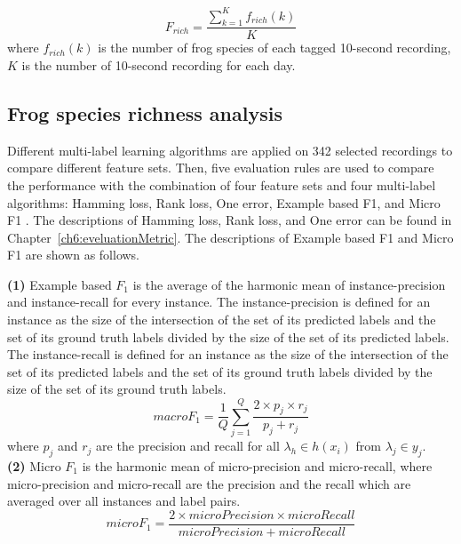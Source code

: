 \begin{equation}
F_{rich} = \frac{\sum_{k=1}^{K}f_{rich}(k)}{K}
\end{equation} 
where $f_{rich}(k)$ is the number of frog species of each tagged 10-second recording, $K$ is the number of 10-second recording for each day.





\subsection{Frog species richness analysis}
Different multi-label learning algorithms are applied on 342 selected recordings to compare different feature sets. Then, five evaluation rules are used to compare the performance with the combination of four feature sets and four multi-label algorithms: Hamming loss, Rank loss, One error, Example based F1, and Micro F1 \citep{Madjarov20123084, ZhangReview2014}. The descriptions of Hamming loss, Rank loss, and One error can be found in Chapter~\ref{ch6:eveluationMetric}. The descriptions of Example based F1  and Micro F1 are shown as follows.



\textbf{(1)}
Example based $F_{1}$ is the average of the harmonic mean of instance-precision and instance-recall for every instance. The instance-precision is defined for an instance as the size of the intersection of the set of its predicted labels and the set of its ground truth labels divided by the size of the set of its predicted labels. The instance-recall is defined for an instance as the size of the intersection of the set of its predicted labels and the set of its ground truth labels divided by the size of the set of its ground truth labels.
\begin{equation}
macroF_{1}=\frac{1}{Q}\sum_{j=1}^{Q}\frac{2 \times p_{j} \times r_{j}}{p_{j}+r_{j}}
\end{equation}
where $p_{j}$ and $r_{j}$ are the precision and recall for all $\lambda_{h} \in h(x_{i})$ from $\lambda_{j} \in y_{j}$.
\\
\textbf{(2)}
Micro $F_{1}$ is the harmonic mean of micro-precision and micro-recall, where micro-precision and micro-recall are the precision and the recall which are averaged over all instances and label pairs. 
\begin{equation}
microF_{1} = \frac{2 \times microPrecision \times microRecall}{microPrecision + microRecall}
\end{equation}



